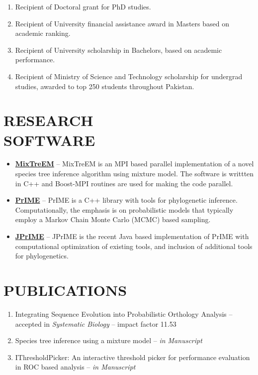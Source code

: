 \documentclass[margin, 10pt]{res} %
\begin{document}
\begin{resume}
\begin{enumerate}
\item Recipient of Doctoral grant for PhD studies.
\item Recipient of University financial assistance award in Masters based on academic ranking.
\item Recipient of University scholarship in Bachelors, based on academic performance.
\item Recipient of Ministry of Science and Technology scholarship for undergrad studies, awarded to top 250 students throughout Pakistan.
\end{enumerate} 


\section{RESEARCH \\ SOFTWARE} 
\begin{itemize}
\item \textbf{\href{http://prime.scilifelab.se/mixtreem/}{MixTreEM}} -- MixTreEM is an MPI based parallel implementation of a novel species tree inference algorithm using mixture model. The software is writtten in C++ and Boost-MPI routines are used for making the code parallel.
\item \textbf{\href{http://prime.scilifelab.se/}{PrIME}} -- PrIME is a C++ library with tools for phylogenetic inference. Computationally, the emphasis is on probabilistic models that typically employ a Markov Chain Monte Carlo (MCMC) based sampling.
\item \textbf{\href{https://code.google.com/p/jprime/}{JPrIME}} -- JPrIME is the recent Java based implementation of PrIME with computational optimization of existing tools, and inclusion of additional tools for phylogenetics.
\end{itemize}


\section{PUBLICATIONS} 
\begin{enumerate}
\item Integrating Sequence Evolution into Probabilistic Orthology Analysis -- accepted in {\sl Systematic Biology} -- impact factor 11.53
\item Species tree inference using a mixture model -- {\sl in Manuscript}
\item IThresholdPicker: An interactive threshold picker for performance evaluation in ROC based analysis -- {\sl in Manuscript}
\end{enumerate}



\end{resume}
\end{document}
